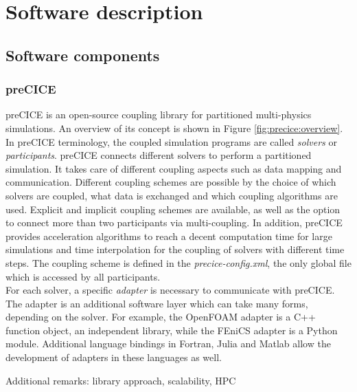 \section{Software description}
\label{section:software}

\subsection{Software components}

\subsubsection{preCICE}

preCICE \cite{Chourdakis:2022} is an open-source coupling library for partitioned multi-physics simulations. An overview of its concept is shown in Figure \ref{fig:precice:overview}. In preCICE terminology, the coupled simulation programs are called \textit{solvers} or \textit{participants}. preCICE connects different solvers to perform a partitioned simulation. It takes care of different coupling aspects such as data mapping and communication. Different coupling schemes are possible \cite{Gatzhammer:2014} by the choice of which solvers are coupled, what data is exchanged and which coupling algorithms are used. Explicit and implicit coupling schemes are available, as well as the option to connect more than two participants via multi-coupling. In addition, preCICE provides acceleration algorithms to reach a decent computation time for large simulations and time interpolation for the coupling of solvers with different time steps. The coupling scheme is defined in the \textit{precice-config.xml}, the only global file which is accessed by all participants.\\
For each solver, a specific \textit{adapter} is necessary to communicate with preCICE. The adapter is an additional software layer which can take many forms, depending on the solver. For example, the OpenFOAM adapter is a C++ function object, an independent library, while the FEniCS adapter is a Python module. Additional language bindings in Fortran, Julia and Matlab allow the development of adapters in these languages as well.

Additional remarks: library approach, scalability, HPC

